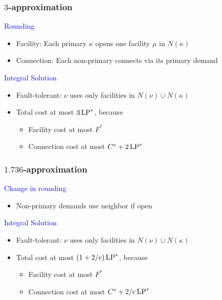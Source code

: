 \documentclass[handout, hyperref, dvipsnames]{beamer}
\begin{document}
\begin{frame}
  \frametitle{$3$-approximation}

  {\Large \textcolor{blue}{
  Rounding}}

  \begin{itemize}
  \item Facility: Each primary $\kappa$ opens one facility $\mu$ in $N(\kappa)$
  \item Connection: Each non-primary connects via its primary demand
  \end{itemize}

  \vspace{.3in}
  {\Large \textcolor{blue}{
  Integral Solution}}

  \begin{itemize}
  \item Fault-tolerant: $\nu$ uses only facilities in
    $N(\nu) \cup N(\kappa)$
  \item Total cost at most $3\,\mbox{\rm LP}^\ast$, because
    \begin{itemize}
    \item Facility cost at most $F^\ast$
    \item Connection cost at most $C^\ast + 2\,\mbox{\rm LP}^\ast$
    \end{itemize}
  \end{itemize}

\end{frame}

\begin{frame}
  \frametitle{$1.736$-approximation} 

  {\Large \textcolor{blue}{
  Change in rounding}}
  \begin{itemize}
  \item Non-primary demands use neighbor if open
  \end{itemize}

  \vspace{.3in}
  {\Large \textcolor{blue}{
  Integral Solution}}
  \begin{itemize}
  \item Fault-tolerant: $\nu$ uses only facilities in
    $N(\nu) \cup N(\kappa)$
  \item Total cost at most $(1+2/e)\,\mbox{\rm LP}^\ast$, because
    \begin{itemize}
    \item Facility cost at most $F^\ast$
    \item Connection cost at most $C^\ast + 2/e\, \mbox{\rm LP}^\ast$
    \end{itemize}
  \end{itemize}
\end{frame}
\end{document}
